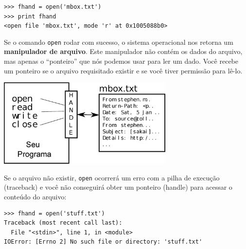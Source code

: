 \beforeverb
\begin{verbatim}
>>> fhand = open('mbox.txt')
>>> print fhand
<open file 'mbox.txt', mode 'r' at 0x1005088b0>
\end{verbatim}
\afterverb
%


Se o comando {\tt open} rodar com sucesso, o sistema operacional nos
retorna um {\bf manipulador de arquivo}. Este manipulador não contém
os dados do arquivo, mas apenas o ``ponteiro'' que nós podemos usar
para ler um dado. Você recebe um ponteiro se o arquivo requisitado
existir e se você tiver permissão para lê-lo.

\beforefig
\centerline{\includegraphics[height=1.75in]{figs2/handle.eps}}
\afterfig

Se o arquivo não existir, {\tt open} ocorrerá um erro com a pilha de execução (traceback)
e você não conseguirá obter um ponteiro (handle) para acessar o conteúdo do arquivo: 

\beforeverb
\begin{verbatim}
>>> fhand = open('stuff.txt')
Traceback (most recent call last):
  File "<stdin>", line 1, in <module>
IOError: [Errno 2] No such file or directory: 'stuff.txt'
\end{verbatim}
\afterverb

